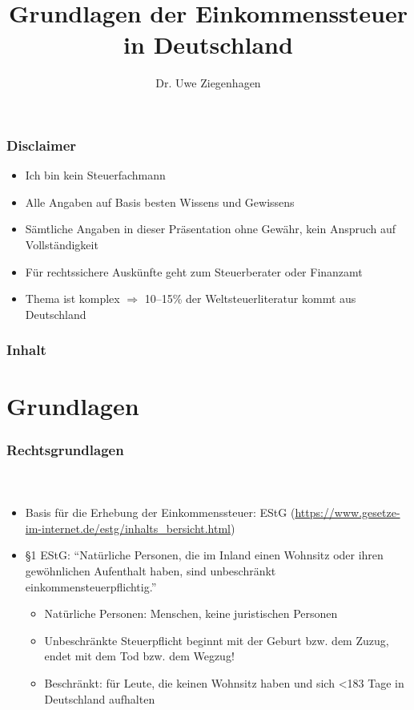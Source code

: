 \documentclass[ngerman]{beamer}
\author{Dr. Uwe Ziegenhagen}
\title{Grundlagen der Einkommenssteuer in Deutschland}
\begin{document}
\begin{frame}

\maketitle

\end{frame}

\begin{frame}
\frametitle{Disclaimer}

\begin{itemize}
\item Ich bin kein Steuerfachmann
\item Alle Angaben auf Basis besten Wissens und Gewissens
\item Sämtliche Angaben in dieser Präsentation ohne Gewähr, kein Anspruch auf Vollständigkeit
\item Für rechtssichere Auskünfte geht zum Steuerberater oder Finanzamt
\item Thema ist komplex $\Rightarrow$ 10--15\% der Weltsteuerliteratur kommt aus Deutschland
\end{itemize}
\end{frame}


\begin{frame}
\frametitle{Inhalt}

\tableofcontents

\end{frame}

\section{Grundlagen}

\begin{frame}
\frametitle{Rechtsgrundlagen}
\framesubtitle{~}

\begin{itemize}
\item Basis für die Erhebung der Einkommenssteuer: EStG (\url{https://www.gesetze-im-internet.de/estg/inhalts_bersicht.html})
\item §1 EStG: \enquote{Natürliche Personen, die im Inland einen Wohnsitz oder ihren gewöhnlichen Aufenthalt haben, sind unbeschränkt einkommensteuerpflichtig.}

\begin{itemize}
	\item Natürliche Personen: Menschen, keine juristischen Personen
	\item Unbeschränkte Steuerpflicht beginnt mit der Geburt bzw. dem Zuzug, endet mit dem Tod bzw. dem Wegzug!
	\item Beschränkt: für Leute, die keinen Wohnsitz haben und sich <183 Tage in Deutschland aufhalten
\end{itemize}
\end{itemize}
\end{frame}
\end{document}
